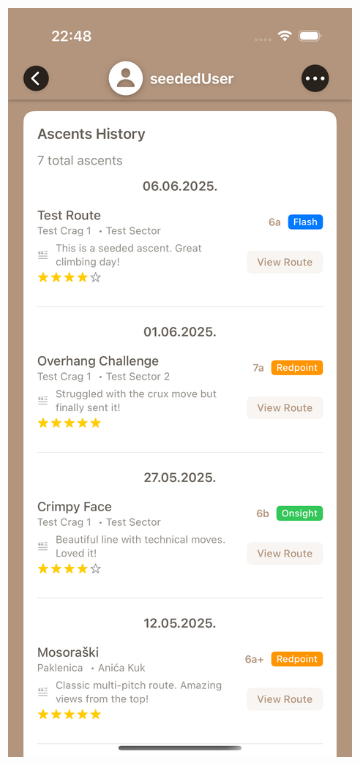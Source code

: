 \begin{figure}[H]
    \centering
    \begin{subfigure}[b]{0.33\textwidth}
        \centering
        \includegraphics[width=\textwidth]{images/implementacija/user_profile_3.png}

\end{subfigure}
\end{figure}

